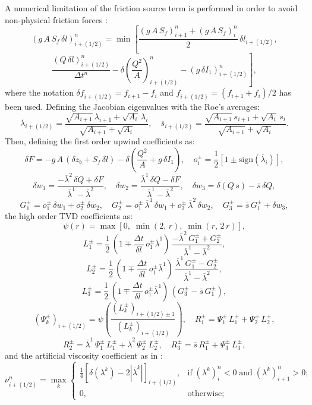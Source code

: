 \documentclass[review,authoryear]{elsarticle}
\newcommand{\eq}[2]{\begin{equation}\label{#2}#1\end{equation}}
\newcommand{\sign} {\mathrm{sign}}
\newcommand{\PA}[1] {\left(#1\right)}
\newcommand{\C}[1] {\left[#1\right]}
\newcommand{\ABS}[1] {\left|#1\right|}
\newcommand{\IR}{_{i+(1/2)}}
\begin{document}
A numerical limitation of the friction source term is performed in order to
avoid non-physical friction forces \citep{JaviFriccion2}:
\[
	\PA{g\,A\,S_f\,\delta l}\IR^n=\min\left[
	\frac{\PA{g\,A\,S_f}_{i+1}^n+\PA{g\,A\,S_f}_i^n}{2}\,\delta l\IR,\right.
\]
\eq
{
	\left.\frac{(Q\,\delta l)\IR^n}{\Delta t^n}-\delta\PA{\frac{Q^2}{A}}\IR^n
	-\PA{g\,\delta I_1}\IR^n\right],
}{EqFrictionLimit}
where the notation $\delta f\IR=f_{i+1}-f_i$ and $f\IR=(f_{i+1}+f_i)/2$ has been
used. Defining the Jacobian eigenvalues with the Roe's \citep{Roe81,JaviSurcos1}
averages:
\eq
{
	\overline{\lambda}\IR=
	\frac{\sqrt{A_{i+1}}\,\lambda_{i+1}+\sqrt{A_i}\,\lambda_i}
	{\sqrt{A_{i+1}}+\sqrt{A_i}},\quad
	\overline{s}\IR=\frac{\sqrt{A_{i+1}}\,s_{i+1}+\sqrt{A_i}\,s_i}
	{\sqrt{A_{i+1}}+\sqrt{A_i}}.
}{EqRoeAv}
Then, defining the first order upwind coefficients as:
\[
	\delta F=-g\,A\,\PA{\delta z_b+S_f\,\delta l}
	-\delta\PA{\frac{Q^2}{A}+g\,\delta I_1},\quad
	o_i^\pm=\frac12\C{1\pm\sign\PA{\overline{\lambda}_i}},
\]
\[
	\delta w_1=\frac{-\overline{\lambda}^2\,\delta Q+\delta F}
	{\overline{\lambda}^1-\overline{\lambda}^2},\quad
	\delta w_2=\frac{\overline{\lambda}^1\,\delta Q-\delta F}
	{\overline{\lambda}^1-\overline{\lambda}^2},\quad
	\delta w_3=\delta\PA{Q\,s}-\overline{s}\,\delta Q,
\]
\eq
{
	G_1^\pm=o_1^\pm\,\delta w_1+o_2^\pm\,\delta w_2,\quad
	G_2^\pm=o_1^\pm\,\overline{\lambda}^1\,\delta w_1
	+o_2^\pm\,\overline{\lambda}^2\,\delta w_2,\quad
	G_3^\pm=\overline{s}\,G_1^\pm+\delta w_3,
}{EqCoeffUpw}
the high order TVD coefficients as:
\[\psi(r)=\max[0,\;\min(2,\,r),\;\min(r,\,2\,r)],\]
\[
	L_1^\pm=\frac12\,
	\PA{1\mp\frac{\Delta t}{\delta l}\,o_1^\pm\overline{\lambda}^1}\,
	\frac{-\overline{\lambda}^2\,G_1^\pm+G_2^\pm}
	{\overline{\lambda}^1-\overline{\lambda}^2},
\]
\[
	L_2^\pm=\frac12\,
	\PA{1\mp\frac{\Delta t}{\delta l}\,o_1^\pm\overline{\lambda}^1}\,
	\frac{\overline{\lambda}^1\,G_1^\pm-G_2^\pm}
	{\overline{\lambda}^1-\overline{\lambda}^2},
\]
\[
	L_3^\pm=\frac12\,
	\PA{1\mp\frac{\Delta t}{\delta l}\,o_1^\pm\overline{\lambda}^1}\,
	\PA{G_3^\pm-\overline{s}\,G_1^\pm},
\]
\[
	\PA{\Psi_k^\pm}\IR
	=\psi\PA{\frac{\PA{L_k^\pm}_{i+(1/2)\pm 1}}{\PA{L_k^\pm}\IR}},\quad
	R_1^\pm=\Psi_1^\pm\,L_1^\pm+\Psi_2^\pm\,L_2^\pm,
\]
\eq
{
	R_2^\pm=\overline{\lambda}^1\,\Psi_1^\pm\,L_1^\pm
	+\overline{\lambda}^2\,\Psi_2^\pm\,L_2^\pm,\quad
	R_3^\pm=\overline{s}\,R_1^\pm+\Psi_3^\pm\,L_3^\pm,
}{EqCoeffTVD}
and the artificial viscosity coefficient as in \cite{JaviImp}:
\eq
{
	\nu\IR^n=\max_k\left\{\begin{array}{cl}
	\frac{1}{4}\C{\delta(\lambda^k)-2\ABS{\overline{\lambda}^k}}\IR,&
	\mathrm{if}\;(\lambda^k)_i^n<0\;\mathrm{and}\;(\lambda^k)_{i+1}^n>0;\\
	0,&\mathrm{otherwise};\end{array}\right.
}{EqEntnu}
\end{document}
